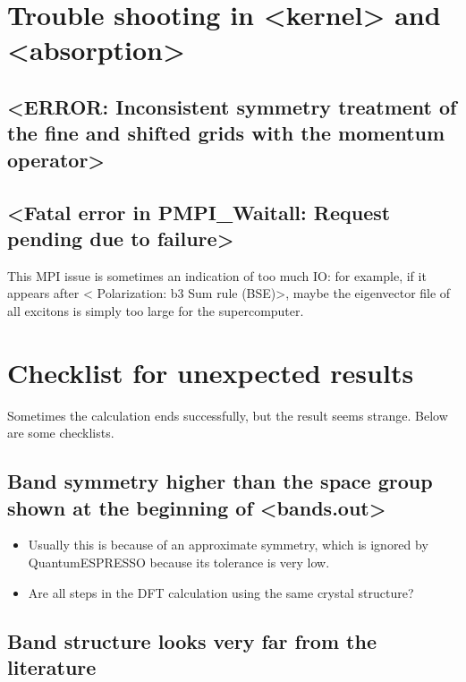 \documentclass[hyperref, a4paper, 12pt]{report}
\def\texttt#1{<#1>}%
\newcommand{\shortcode}[1]{\texttt{#1}}
\begin{document}
\section{Trouble shooting in \shortcode{kernel} and \shortcode{absorption}}

\subsection{\shortcode{ERROR: Inconsistent symmetry treatment of the fine and shifted grids with the momentum operator}}

\subsection{\shortcode{Fatal error in PMPI_Waitall: Request pending due to failure}}

This MPI issue is sometimes an indication of too much IO: 
for example, if it appears after \shortcode{ Polarization: b3 Sum rule (BSE)}, 
maybe the eigenvector file of all excitons 
is simply too large for the supercomputer. 

\section{Checklist for unexpected results}

Sometimes the calculation ends successfully,
but the result seems strange.
Below are some checklists.

\subsection{Band symmetry higher than the space group shown at the beginning of \shortcode{bands.out}}

\begin{itemize}
    \item Usually this is because of an approximate symmetry,
    which is ignored by QuantumESPRESSO because its tolerance is very low.
    \item Are all steps in the DFT calculation using the same crystal structure?
\end{itemize}

\subsection{Band structure looks very far from the literature}
\end{document}
